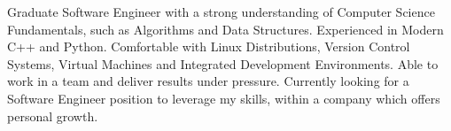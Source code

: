 
\begin{cventries}
    \cventryi
        {Graduate Software Engineer with a strong understanding of Computer Science Fundamentals, such as  Algorithms and Data Structures. Experienced in Modern C++ and Python. Comfortable with Linux Distributions, Version Control Systems, Virtual Machines and Integrated Development Environments. Able to work in a team and deliver results under pressure. Currently looking for a Software Engineer position to leverage my skills, within a company which offers personal growth.}
\end{cventries}
